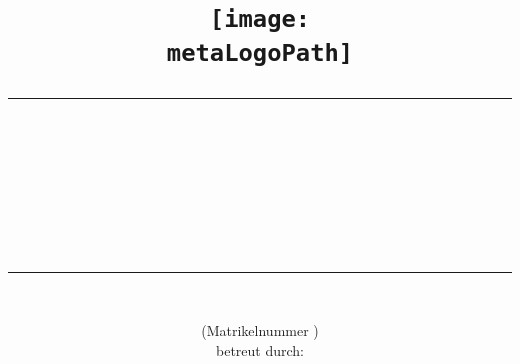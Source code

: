 \documentclass[../Master.tex]{subfiles}
\begin{document}
\title{%
  \begin{center}%
    \texttt{[image: \\metaLogoPath]} \\%
    \vspace{1.5cm} {\large \metaSupertitle}%
  \end{center}%
  \rule{\textwidth}{.5mm} \\%
  {\bfseries \metaTitle} \\[1ex]%
  {\large\bfseries \metaSubtitle} \\%
  \rule{\textwidth}{.5mm}%
}%

\author{\metaAuthor{} \\%
    {\normalsize (Matrikelnummer \metaMatrikelnr)}\\[1ex]%
    {\normalsize betreut durch:}\\ \metaSupervisor}%

\date{\metaDate}%

\maketitle%
\end{document}
